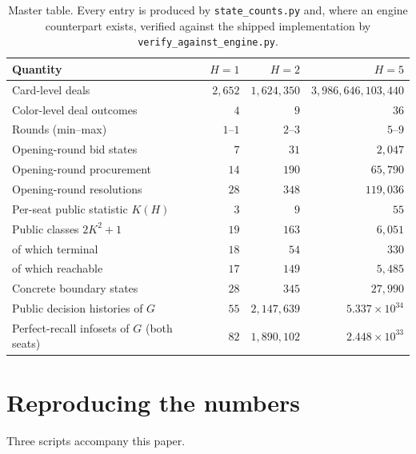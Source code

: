 \documentclass[11pt]{article}
\theoremstyle{plain}
\theoremstyle{definition}
\theoremstyle{remark}
\newcommand{\code}[1]{\texttt{\small #1}}
\begin{document}
\begin{table}[!ht]
\centering
\caption{Master table. Every entry is produced by \code{state\_counts.py}
and, where an engine counterpart exists, verified against the shipped
implementation by \code{verify\_against\_engine.py}.}
\label{tab:master}
\begin{tabular}{@{}lrrr@{}}
\toprule
Quantity & $H=1$ & $H=2$ & $H=5$\\
\midrule
Card-level deals            & $2{,}652$ & $1{,}624{,}350$ & $3{,}986{,}646{,}103{,}440$\\
Color-level deal outcomes  & $4$ & $9$ & $36$\\
Rounds (min--max)           & $1$--$1$ & $2$--$3$ & $5$--$9$\\
Opening-round bid states    & $7$ & $31$ & $2{,}047$\\
Opening-round procurement   & $14$ & $190$ & $65{,}790$\\
Opening-round resolutions   & $28$ & $348$ & $119{,}036$\\
Per-seat public statistic $K(H)$ & $3$ & $9$ & $55$\\
Public classes $2K^2+1$     & $19$ & $163$ & $6{,}051$\\
\quad of which terminal     & $18$ & $54$ & $330$\\
\quad of which reachable    & $17$ & $149$ & $5{,}485$\\
Concrete boundary states    & $28$ & $345$ & $27{,}990$\\
Public decision histories of $G$ & $55$ & $2{,}147{,}639$ & $5.337\times10^{34}$\\
Perfect-recall infosets of $G$ (both seats) & $82$ & $1{,}890{,}102$ & $2.448\times10^{33}$\\
\bottomrule
\end{tabular}
\end{table}

\appendix

\section{Reproducing the numbers}\label{app:repro}

Three scripts accompany this paper.
\end{document}

